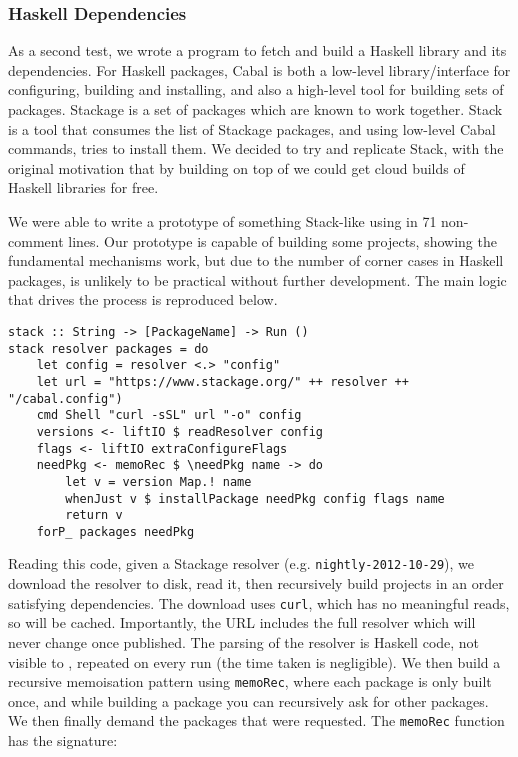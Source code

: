 \subsubsection{Haskell Dependencies}

As a second test, we wrote a program to fetch and build a Haskell library and its dependencies. For Haskell packages, Cabal is both a low-level library/interface for configuring, building and installing, and also a high-level tool for building sets of packages. Stackage is a set of packages which are known to work together. Stack is a tool that consumes the list of Stackage packages, and using low-level Cabal commands, tries to install them. We decided to try and replicate Stack, with the original motivation that by building on top of \Rattle we could get cloud builds of Haskell libraries for free.

We were able to write a prototype of something Stack-like using \Rattle in 71 non-comment lines. Our prototype is capable of building some projects, showing the fundamental mechanisms work, but due to the number of corner cases in Haskell packages, is unlikely to be practical without further development. The main logic that drives the process is reproduced below.

\begin{verbatim}
stack :: String -> [PackageName] -> Run ()
stack resolver packages = do
    let config = resolver <.> "config"
    let url = "https://www.stackage.org/" ++ resolver ++ "/cabal.config")
    cmd Shell "curl -sSL" url "-o" config
    versions <- liftIO $ readResolver config
    flags <- liftIO extraConfigureFlags
    needPkg <- memoRec $ \needPkg name -> do
        let v = version Map.! name
        whenJust v $ installPackage needPkg config flags name
        return v
    forP_ packages needPkg
\end{verbatim}

Reading this code, given a Stackage resolver (e.g. \texttt{nightly-2012-10-29}), we download the resolver to disk, read it, then recursively build projects in an order satisfying dependencies. The download uses \texttt{curl}, which has no meaningful reads, so will be cached. Importantly, the URL includes the full resolver which will never change once published. The parsing of the resolver is Haskell code, not visible to \Rattle, repeated on every run (the time taken is negligible). We then build a recursive memoisation pattern using \texttt{memoRec}, where each package is only built once, and while building a package you can recursively ask for other packages. We then finally demand the packages that were requested. The \texttt{memoRec} function has the signature:

